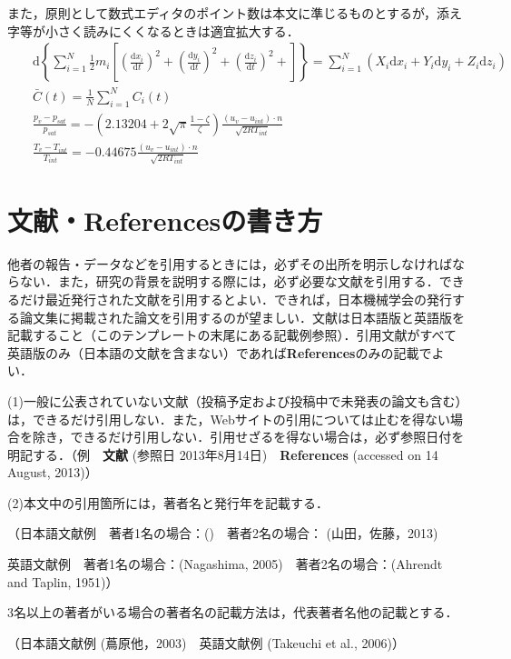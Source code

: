 \documentclass[a4jsme, fleqn, dvipdfmx]{jsmepaper}
\begin{document}
また，原則として数式エディタのポイント数は本文に準じるものとするが，添え字等が小さく読みにくくなるときは適宜拡大する．
\\
\begin{eqnarray}
&&\mbox{d}\left\{\sum^N_{i=1}\frac{1}{2}m_i\left[\left(\frac{\mbox{d}x_i}{\mbox{d}t}\right)^2+\left(\frac{\mbox{d}y_i}{\mbox{d}t}\right)^2+\left(\frac{\mbox{d}z_i}{\mbox{d}t}\right)^2+\right]\right\}=\sum^N_{i=1}(X_i\mbox{d}x_i+Y_i\mbox{d}y_i+Z_i\mbox{d}z_i)\\
&&\bar{C}(t)=\frac{1}{N}\sum^N_{i=1}C_i(t)\\
&&\frac{p_v-p_{sat}}{p_{sat}}=-\left(2.13204+2\sqrt{\pi}\frac{1-\zeta}{\zeta}\right)\frac{(u_v-u_{int})\cdot n}{\sqrt{2RT_{int}}}\\
&&\frac{T_v-T_{int}}{T_{int}}=-0.44675\frac{(u_v-u_{int})\cdot n}{\sqrt{2RT_{int}}}
\end{eqnarray}

\section{文献・Referencesの書き方}

他者の報告・データなどを引用するときには，必ずその出所を明示しなければならない．また，研究の背景を説明する際には，必ず必要な文献を引用する．できるだけ最近発行された文献を引用するとよい．できれば，日本機械学会の発行する論文集に掲載された論文を引用するのが望ましい．文献は日本語版と英語版を記載すること（このテンプレートの末尾にある記載例参照）．引用文献がすべて英語版のみ（日本語の文献を含まない）であれば\textbf{References}のみの記載でよい．

(1)一般に公表されていない文献（投稿予定および投稿中で未発表の論文も含む）は，できるだけ引用しない．また，Webサイトの引用については止むを得ない場合を除き，できるだけ引用しない．引用せざるを得ない場合は，必ず参照日付を明記する．（例　\textbf{文献} (参照日 2013年8月14日)　\textbf{References} (accessed on 14 August, 2013)）

(2)本文中の引用箇所には，著者名と発行年を記載する．

（日本語文献例　著者1名の場合：(\citealp{竹内:JSME2005})　著者2名の場合： (山田，佐藤，2013)

英語文献例　著者1名の場合：(Nagashima, 2005)　著者2名の場合：(Ahrendt and Taplin, 1951)）

3名以上の著者がいる場合の著者名の記載方法は，代表著者名他の記載とする．

（日本語文献例 (蔦原他，2003)　英語文献例 (Takeuchi et al., 2006)）
\end{document}
